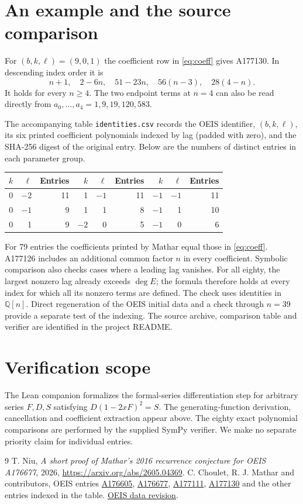 \documentclass[11pt]{article}
\begin{document}
\section*{An example and the source comparison}
For $(b,k,\ell)=(9,0,1)$ the coefficient row in \eqref{eq:coeff} gives A177130. In descending index order it is
\[
 n+1,\quad 2-6n,\quad 51-23n,\quad 56(n-3),\quad 28(4-n).
\]
It holds for every $n\ge4$. The two endpoint terms at $n=4$ can also be read directly from $a_0,\ldots,a_4=1,9,19,120,583$.

The accompanying table \texttt{identities.csv} records the OEIS identifier, $(b,k,\ell)$, its six printed coefficient polynomials indexed by lag (padded with zero), and the SHA-256 digest of the original entry. Below are the numbers of distinct entries in each parameter group.
\begin{center}\begin{tabular}{rrr|rrr|rrr}
\toprule
$k$&$\ell$&Entries&$k$&$\ell$&Entries&$k$&$\ell$&Entries\\\midrule
0&$-2$&11&1&$-1$&11&$-1$&$-1$&11\\
0&$-1$&9&1&1&8&$-1$&1&10\\
0&1&9&$-2$&0&5&$-1$&0&6\\\bottomrule
\end{tabular}\end{center}
For 79 entries the coefficients printed by Mathar equal those in \eqref{eq:coeff}. A177126 includes an additional common factor $n$ in every coefficient. Symbolic comparison also checks cases where a leading lag vanishes. For all eighty, the largest nonzero lag already exceeds $\deg E$; the formula therefore holds at every index for which all its nonzero terms are defined.
The check uses identities in $\mathbb Q[n]$. Direct regeneration of the OEIS initial data and a check through $n=39$ provide a separate test of the indexing. The source archive, comparison table and verifier are identified in the project README.

\section*{Verification scope}
The Lean companion formalizes the formal-series differentiation step for arbitrary series $F,D,S$ satisfying $D(1-2xF)^2=S$. The generating-function derivation, cancellation and coefficient extraction appear above. The eighty exact polynomial comparisons are performed by the supplied SymPy verifier. We make no separate priority claim for individual entries.

\begin{thebibliography}{9}
 T. Niu, \emph{A short proof of Mathar's 2016 recurrence conjecture for OEIS A176677}, 2026, \url{https://arxiv.org/abs/2605.04369}.
 C. Choulet, R. J. Mathar and contributors, OEIS entries \href{https://oeis.org/A176605}{A176605}, \href{https://oeis.org/A176677}{A176677}, \href{https://oeis.org/A177111}{A177111}, \href{https://oeis.org/A177130}{A177130} and the other entries indexed in the table. \href{https://github.com/oeis/oeisdata/tree/091a90f51479669655f4e46343867ea2abd5d4ff}{OEIS data revision}.
\end{thebibliography}
\end{document}
